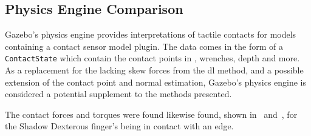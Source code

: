 \subsection{Physics Engine Comparison}\label{sec:1-tactile-perception-results-gazebo-comparison}

Gazebo's physics engine provides interpretations of tactile contacts for models containing a contact sensor model plugin. The data comes in the form of a \texttt{ContactState} which contain the contact points in , wrenches, depth and more. As a replacement for the lacking skew forces from the \gls{dl} method, and a possible extension of the contact point and normal estimation, Gazebo's physics engine is considered a potential supplement to the methods presented. \medskip

The contact forces and torques were found likewise found, shown in~ and~, for the Shadow Dexterous finger's being in contact with an edge.


